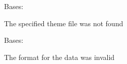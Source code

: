 \documentclass[letterpaper,10pt,english]{sphinxmanual}
\begin{document}

\begin{fulllineitems}
\label{blocks:serge.blocks.themes.BadThemeFile}
Bases: 

The specified theme file was not found

\end{fulllineitems}


\begin{fulllineitems}
\label{blocks:serge.blocks.themes.InvalidFormat}
Bases: 

The format for the data was invalid

\end{fulllineitems}

\end{document}
